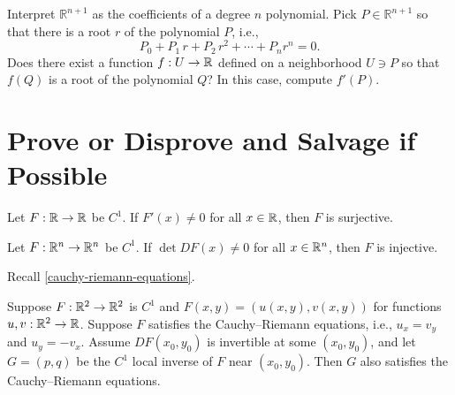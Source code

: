 \documentclass{homework}
\begin{document}
\begin{problem}
  Interpret $\mathbb{R}^{n+1}$ as the coefficients of a degree $n$ polynomial. Pick $P \in \mathbb{R}^{n+1}$ so that there is a root $r$ of the polynomial $P$, i.e.,
  \[
    P_0 + P_1 \, r + P_2 \, r^2 + \cdots + P_n r^n = 0.
  \]
  Does there exist a function $f : U \to \mathbb{R}$ defined on a neighborhood $U \ni P$ so that $f(Q)$ is a root of the polynomial $Q$? In this case, compute $f'(P)$.
\end{problem}

\section{Prove or Disprove and Salvage if Possible}

\begin{problem}
Let $F:\mathbb{R}\to\mathbb{R}$ be $C^1$. If $F'(x) \neq 0$ for all $x\in\mathbb{R}$, then $F$ is surjective.
\end{problem}

\begin{problem}
Let $F:\mathbb{R}^n\to\mathbb{R}^n$ be $C^1$. If $\det DF(x)\neq 0$ for all $x\in\mathbb{R}^n$, then $F$ is injective.
\end{problem}

\begin{problem}
  Recall \ref{cauchy-riemann-equations}.

  Suppose $F:\mathbb{R}^2 \to\mathbb{R}^2$ is $C^1$ and $F(x,y) = (u(x,y),v(x,y))$ for functions $u, v : \mathbb{R}^2 \to \mathbb{R}$.  Suppose $F$ satisfies the Cauchy--Riemann equations, i.e., $u_x=v_y$ and $u_y=-v_x$. Assume $DF(x_0,y_0)$ is invertible at some $(x_0,y_0)$, and let $G=(p,q)$ be the $C^1$ local inverse of $F$ near $(x_0,y_0)$. Then $G$ also satisfies the Cauchy--Riemann equations.
\end{problem}
\end{document}
